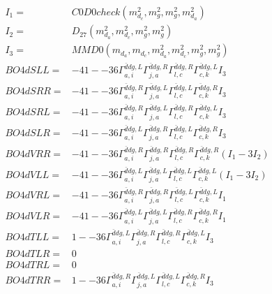 \documentclass[A4,landscape]{article}
\begin{document}
\begin{align} 
I_1 = & C0D0check(m^2_{d_{{c}}}, m^2_{g}, m^2_{g}, m^2_{d_{{a}}}) \\ 
I_2 = & D_{27}(m^2_{d_{{a}}}, m^2_{d_{{c}}}, m^2_{g}, m^2_{g}) \\ 
I_3 = & MMD0(m_{d_{{a}}}, m_{d_{{c}}}, m^2_{d_{{a}}}, m^2_{d_{{c}}}, m^2_{g}, m^2_{g}) \\ 
  BO4dSLL= & -4 1
--
36 \Gamma^{\bar{d}d g ,L}_{a, i} \Gamma^{\bar{d}d g ,R}_{j, a} \Gamma^{\bar{d}d g ,R}_{l, c} \Gamma^{\bar{d}d g ,L}_{c, k} I_3 \\ 
  BO4dSRR= & -4 1
--
36 \Gamma^{\bar{d}d g ,R}_{a, i} \Gamma^{\bar{d}d g ,L}_{j, a} \Gamma^{\bar{d}d g ,L}_{l, c} \Gamma^{\bar{d}d g ,R}_{c, k} I_3 \\ 
  BO4dSRL= & -4 1
--
36 \Gamma^{\bar{d}d g ,R}_{a, i} \Gamma^{\bar{d}d g ,L}_{j, a} \Gamma^{\bar{d}d g ,R}_{l, c} \Gamma^{\bar{d}d g ,L}_{c, k} I_3 \\ 
  BO4dSLR= & -4 1
--
36 \Gamma^{\bar{d}d g ,L}_{a, i} \Gamma^{\bar{d}d g ,R}_{j, a} \Gamma^{\bar{d}d g ,L}_{l, c} \Gamma^{\bar{d}d g ,R}_{c, k} I_3 \\ 
  BO4dVRR= & -4 1
--
36 \Gamma^{\bar{d}d g ,R}_{a, i} \Gamma^{\bar{d}d g ,R}_{j, a} \Gamma^{\bar{d}d g ,R}_{l, c} \Gamma^{\bar{d}d g ,R}_{c, k} (I_1 - 3 I_2) \\ 
  BO4dVLL= & -4 1
--
36 \Gamma^{\bar{d}d g ,L}_{a, i} \Gamma^{\bar{d}d g ,L}_{j, a} \Gamma^{\bar{d}d g ,L}_{l, c} \Gamma^{\bar{d}d g ,L}_{c, k} (I_1 - 3 I_2) \\ 
  BO4dVRL= & -4 1
--
36 \Gamma^{\bar{d}d g ,R}_{a, i} \Gamma^{\bar{d}d g ,R}_{j, a} \Gamma^{\bar{d}d g ,L}_{l, c} \Gamma^{\bar{d}d g ,L}_{c, k} I_1 \\ 
  BO4dVLR= & -4 1
--
36 \Gamma^{\bar{d}d g ,L}_{a, i} \Gamma^{\bar{d}d g ,L}_{j, a} \Gamma^{\bar{d}d g ,R}_{l, c} \Gamma^{\bar{d}d g ,R}_{c, k} I_1 \\ 
  BO4dTLL= & 1
--
36 \Gamma^{\bar{d}d g ,L}_{a, i} \Gamma^{\bar{d}d g ,R}_{j, a} \Gamma^{\bar{d}d g ,R}_{l, c} \Gamma^{\bar{d}d g ,L}_{c, k} I_3 \\ 
  BO4dTLR= & 0 \\ 
  BO4dTRL= & 0 \\ 
  BO4dTRR= & 1
--
36 \Gamma^{\bar{d}d g ,R}_{a, i} \Gamma^{\bar{d}d g ,L}_{j, a} \Gamma^{\bar{d}d g ,L}_{l, c} \Gamma^{\bar{d}d g ,R}_{c, k} I_3 \\ 
\end{align} 
\end{document}
